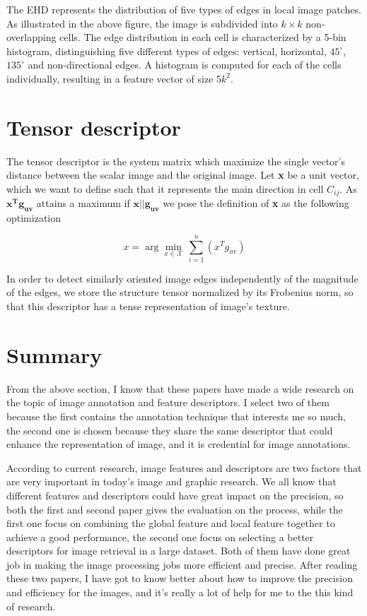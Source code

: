 \documentclass[pdftex,12pt,a4paper]{article}
\begin{document}
The EHD represents the distribution of five types of edges in
local image patches. As illustrated in the above figure, the image is subdivided
into $k \times k$ non-overlapping cells. The edge distribution in each cell
is characterized by a 5-bin histogram, distinguishing five different
types of edges: vertical, horizontal, $45^{\circ}$, $135^{\circ}$ and non-directional edges. 
A histogram is computed for each of the cells individually, resulting in a feature vector of size 5$k^{2}$.


\section{Tensor descriptor}
The tensor descriptor is the system matrix which maximize the single vector's distance between the scalar image and the original image.
Let \textbf{x} be a unit vector, which we want to define such that it represents the main direction in cell $C_{ij}$.
As $\bm{x^{T}g_{uv}}$ attains a maximum if $\bm{x||g_{uv}}$ we pose the definition of \textbf{x} as the following optimization

\begin{displaymath}{x}=\arg\underset{x\in\mathcal{X}}{\min}\,{\sum_{i=1}^{n}}(x^{T}g_{uv})
\end{displaymath}

In order to detect similarly oriented image edges independently of the magnitude of the edges, we store the structure
tensor normalized by its Frobenius norm, so that this descriptor has a tense representation of image's texture.


\section{Summary}
From the above section, I know that these papers have made a wide research on the topic of image annotation and feature
descriptors. I select two of them because the first contains the annotation technique that interests me so much, the second
one is chosen because they share the same descriptor that could enhance the representation of image, and it is credential for
image annotations.

According to current research, image features and descriptors are two factors that are very important in today's image and
graphic research. We all know that different features and descriptors could have great impact on the precision, so both the
first and second paper gives the evaluation on the process, while the first one focus on combining the global feature and local feature together to achieve a good performance, the second one focus on selecting a better descriptors for image retrieval in a large dataset. Both of them have done great job in making the image processing jobs more efficient and precise. After reading these two papers, I have got to know better about how to improve the precision and efficiency for
the images, and it's really a lot of help for me to the this kind of research.
\end{document}
